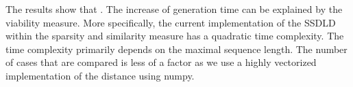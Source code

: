 \documentclass[./../../paper.tex]{subfiles}
\begin{document}
The results show that . The increase of generation time can be explained by the viability measure. More specifically, the current implementation of the \gls{SSDLD} within the sparsity and similarity measure has a quadratic time complexity. The time complexity primarily depends on the maximal sequence length. The number of cases that are compared is less of a factor as we use a highly vectorized implementation of the distance using numpy.   
\end{document}
